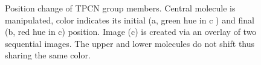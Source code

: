 \begin{figure}[!h]
 \centering
 \caption{Position change of TPCN group members. Central molecule is manipulated, color indicates its initial (a, green hue in c ) and final (b, red hue in c) position. Image (c) is created via an overlay of two sequential images. The upper and lower molecules do not shift thus sharing the same color.}
 \label{fig:TPCN-manipulation}
\end{figure}

